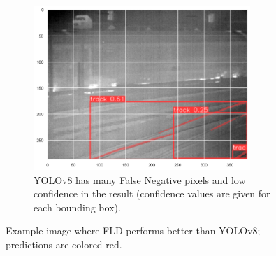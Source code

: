 \documentclass[Master,MDS,english]{BASE/twbook} %
\begin{document}
\begin{figure}
\begin{subfigure}[t]{.33\textwidth}
  \includegraphics[width=0.9\textwidth]{images/results/example1_yolo}
  \caption{YOLOv8 has many False Negative pixels and low confidence in the result (confidence values are given for each bounding box). }
\end{subfigure}
\caption{Example image where FLD performs better than YOLOv8; predictions are colored red. }
\label{fig:res_example1}
\end{figure}
\end{document}
